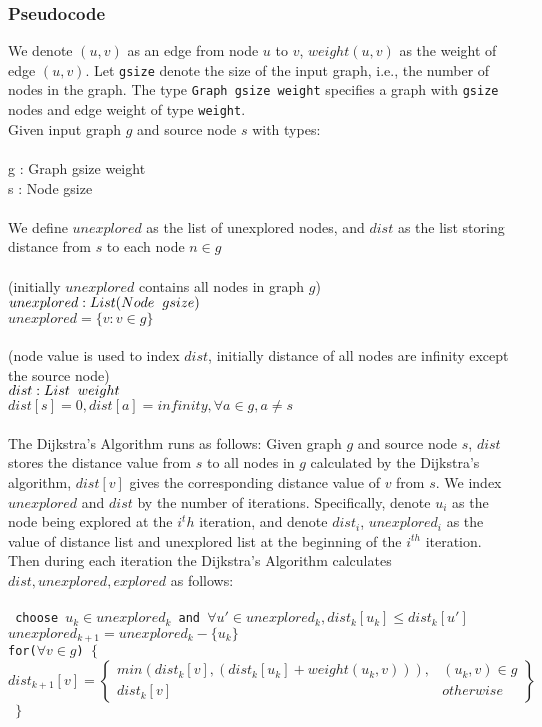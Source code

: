 \subsubsection{Pseudocode}
We denote $(u, v)$ as an edge from node $u$ to $v$, $weight(u, v)$ as the weight of edge $(u, v)$. Let \texttt{gsize} denote the size of the input graph, i.e., the number of nodes in the graph. The type \texttt{Graph gsize weight} specifies a graph with \texttt{gsize} nodes and edge weight of type \texttt{weight}. 
\\
Given input graph $g$ and source node $s$ with types:
\\\\
  \tab g : Graph gsize weight\\
  \tab s : Node gsize
\\\\
We define $unexplored$ as the list of unexplored nodes, and $dist$ as the list storing distance from $s$ to each node $n \in g$
\\\\
\tab (initially $unexplored$ contains all nodes in graph $g$)\\
\tab $unexplored : List (Node \hspace*{0.2cm} gsize)$\\
\tab $unexplored = \{v : v \in g\}$
\\\\
\tab (node value is used to index $dist$, initially distance of all nodes are infinity except 
\\ \tab the source node)\\
\tab $dist : List \hspace*{0.2cm} weight$ \\
\tab $dist[s] = 0, dist[a] = infinity, \forall a \in g, a \neq s$
\\\\The Dijkstra's Algorithm runs as follows: 
Given graph $g$ and source node $s$, $dist$ stores the distance value from $s$ to all nodes in $g$ calculated by the Dijkstra's algorithm, $dist[v]$ gives the corresponding distance value of $v$ from $s$. We index $unexplored$ and $dist$ by the number of iterations. Specifically, denote $u_i$ as the node being explored at the $i^th$ iteration, and denote $dist_i$, $unexplored_i$ as the value of distance list and unexplored list at the beginning of the $i^{th}$ iteration. Then during each iteration the Dijkstra's Algorithm calculates $dist, unexplored, explored$ as follows:
\\\\
\texttt{
  \tab\tab choose $u_k \in unexplored_k$ and $\forall u' \in unexplored_k, dist_k[u_k] \leq dist_k[u']$ \\
  \tab\tab $unexplored_{k+1} = unexplored_k - \{u_k\}$                    \\
  \tab\tab for($\forall v \in g$) $\{$
  \tab\[
        dist_{k+1}[v] = \left.
       \begin{cases} 
          min(dist_k[v], (dist_k[u_k] + weight(u_k,v))), & (u_k,v) \in g \\ 
          dist_k[v] & otherwise 
        \end{cases}
        \right\}
      \]
  \tab\tab $\}$ \\
}

